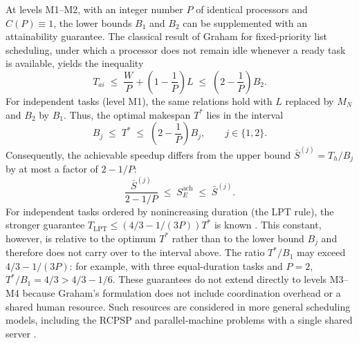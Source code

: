 \begin{remark}\label{rem:graham}
At levels M1--M2, with an integer number $P$ of identical processors and $C(P) \equiv 1$, the lower bounds $B_1$ and $B_2$ can be supplemented with an attainability guarantee. The classical result of Graham for fixed-priority list scheduling, under which a processor does not remain idle whenever a ready task is available, yields the inequality \cite{graham1966bounds}
\[
  T_{ai} \;\le\; \frac{W}{P} + \left(1 - \frac{1}{P}\right) L \;\le\; \left(2 - \frac{1}{P}\right) B_2.
\]
For independent tasks (level M1), the same relations hold with $L$ replaced by $M_N$ and $B_2$ by $B_1$. Thus, the optimal makespan $T^{*}$ lies in the interval
\[
  B_j \;\le\; T^{*} \;\le\; \left(2 - \frac{1}{P}\right) B_j, \qquad j \in \{1, 2\}.
\]
Consequently, the achievable speedup differs from the upper bound $\bar S^{(j)} = T_h/B_j$ by at most a factor of $2 - 1/P$:
\[
  \frac{\bar S^{(j)}}{2 - 1/P} \;\le\; S_E^{\text{ach}} \;\le\; \bar S^{(j)}.
\]
For independent tasks ordered by nonincreasing duration (the LPT rule), the stronger guarantee $T_{\mathrm{LPT}} \le \left(4/3 - 1/(3P)\right) T^{*}$ is known \cite{graham1969bounds}. This constant, however, is relative to the optimum $T^{*}$ rather than to the lower bound $B_j$ and therefore does not carry over to the interval above. The ratio $T^{*}/B_1$ may exceed $4/3 - 1/(3P)$: for example, with three equal-duration tasks and $P = 2$, $T^{*}/B_1 = 4/3 > 4/3 - 1/6$. These guarantees do not extend directly to levels M3--M4 because Graham's formulation does not include coordination overhead or a shared human resource. Such resources are considered in more general scheduling models, including the RCPSP and parallel-machine problems with a single shared server \cite{brucker1999resource,hall2000parallel,kravchenko1997parallel}.
\end{remark}

